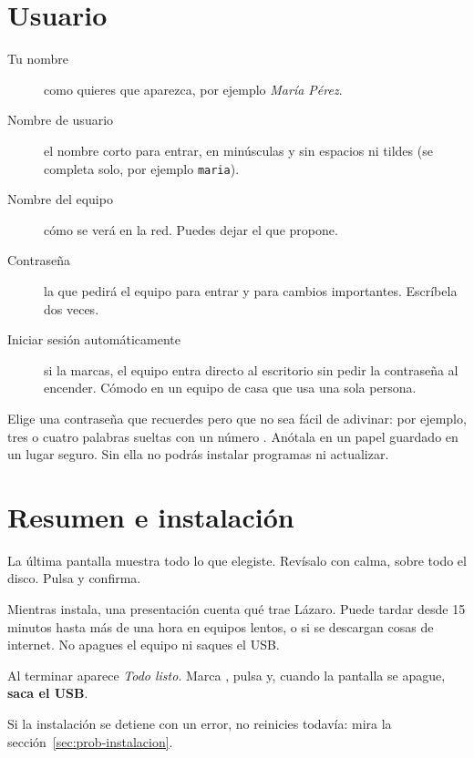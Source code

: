 \section{Usuario}

\begin{description}
  \item[Tu nombre] como quieres que aparezca, por ejemplo \emph{María
    Pérez}.
  \item[Nombre de usuario] el nombre corto para entrar, en minúsculas y sin
    espacios ni tildes (se completa solo, por ejemplo \texttt{maria}).
  \item[Nombre del equipo] cómo se verá en la red. Puedes dejar el que
    propone.
  \item[Contraseña] la que pedirá el equipo para entrar y para cambios
    importantes. Escríbela dos veces.
  \item[Iniciar sesión automáticamente] si la marcas, el equipo entra
    directo al escritorio sin pedir la contraseña al encender. Cómodo en un
    equipo de casa que usa una sola persona.
\end{description}

\begin{consejo}
Elige una contraseña que recuerdes pero que no sea fácil de adivinar: por
ejemplo, tres o cuatro palabras sueltas con un número
\cite{incibe-contrasenas}. Anótala en un papel guardado en un lugar
seguro. Sin ella no podrás instalar programas ni actualizar.
\end{consejo}

\section{Resumen e instalación}

La última pantalla muestra todo lo que elegiste. Revísalo con calma, sobre
todo el disco. Pulsa  y confirma.

Mientras instala, una presentación cuenta qué trae Lázaro. Puede tardar
desde 15 minutos hasta más de una hora en equipos lentos, o si se
descargan cosas de internet. No apagues el equipo ni saques el USB.

Al terminar aparece \emph{Todo listo}. Marca , pulsa
 y, cuando la pantalla se apague, \textbf{saca el USB}.


Si la instalación se detiene con un error, no reinicies todavía: mira
la sección~\ref{sec:prob-instalacion}.

\fuentes
